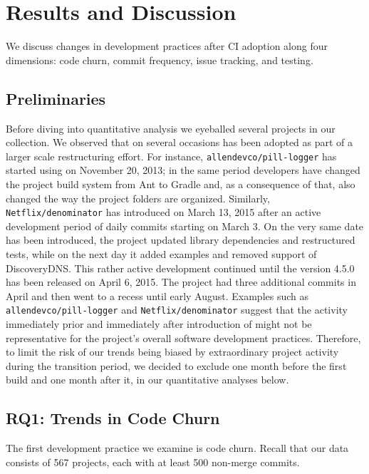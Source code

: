 
\section{Results and Discussion}

We discuss changes in development practices after CI adoption along four 
dimensions: code churn, commit frequency, issue tracking, and testing. 

\subsection{Preliminaries}
\label{sec:examples}

Before diving into quantitative analysis we eyeballed several projects in our 
collection. 
We observed that on several occasions \Tvis has been adopted as part of a 
larger scale restructuring effort. 
For instance, \texttt{allendevco/pill-logger} has started using \Tvis on November 
20, 2013; in the same period developers have changed the project build system 
from Ant to Gradle and, as a consequence of that, also changed the way the 
project folders are organized.
Similarly, \texttt{Netflix/denominator} has introduced \Tvis on March 13, 2015
after an active development period of daily commits starting on March 3.
On the very same date \Tvis has been introduced, the project updated library 
dependencies and restructured tests, while on the next day it added examples 
and removed support of DiscoveryDNS.
This rather active development continued until the version 4.5.0 has been 
released on April 6, 2015.
The project had three additional commits in April and then went to a recess 
until early August. 
Examples such as \texttt{allendevco/pill-logger} and \texttt{Netflix/denominator} 
suggest that the activity immediately prior and immediately after introduction 
of \Tvis might not be representative for the project's overall software development
practices.
Therefore, to limit the risk of our trends being biased by extraordinary project 
activity during the transition period, we decided to exclude one month before 
the first \Tvis build and one month after it, in our quantitative analyses below.

\subsection{RQ1: Trends in Code Churn}

The first development practice we examine is code churn.
Recall that our data consists of 567 projects, each with at least 500 non-merge 
commits.

